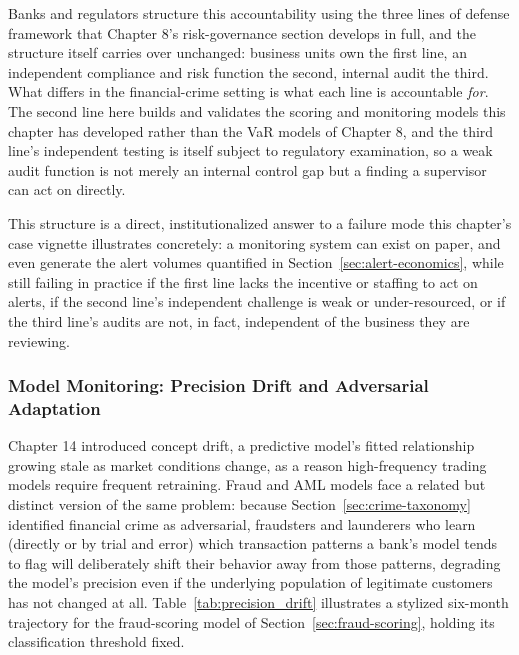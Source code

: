 \documentclass[../ai_in_finance]{subfiles}
\begin{document}
Banks and regulators structure this accountability using the three lines of defense framework that Chapter 8's risk-governance section develops in full, and the structure itself carries over unchanged: business units own the first line, an independent compliance and risk function the second, internal audit the third. What differs in the financial-crime setting is what each line is accountable \emph{for}. The second line here builds and validates the scoring and monitoring models this chapter has developed rather than the VaR models of Chapter 8, and the third line's independent testing is itself subject to regulatory examination, so a weak audit function is not merely an internal control gap but a finding a supervisor can act on directly.

This structure is a direct, institutionalized answer to a failure mode this chapter's case vignette illustrates concretely: a monitoring system can exist on paper, and even generate the alert volumes quantified in Section~\ref{sec:alert-economics}, while still failing in practice if the first line lacks the incentive or staffing to act on alerts, if the second line's independent challenge is weak or under-resourced, or if the third line's audits are not, in fact, independent of the business they are reviewing.

\subsubsection*{Model Monitoring: Precision Drift and Adversarial Adaptation}

Chapter 14 introduced concept drift, a predictive model's fitted relationship growing stale as market conditions change, as a reason high-frequency trading models require frequent retraining. Fraud and AML models face a related but distinct version of the same problem: because Section~\ref{sec:crime-taxonomy} identified financial crime as adversarial, fraudsters and launderers who learn (directly or by trial and error) which transaction patterns a bank's model tends to flag will deliberately shift their behavior away from those patterns, degrading the model's precision even if the underlying population of legitimate customers has not changed at all. Table~\ref{tab:precision_drift} illustrates a stylized six-month trajectory for the fraud-scoring model of Section~\ref{sec:fraud-scoring}, holding its classification threshold fixed.
\end{document}
